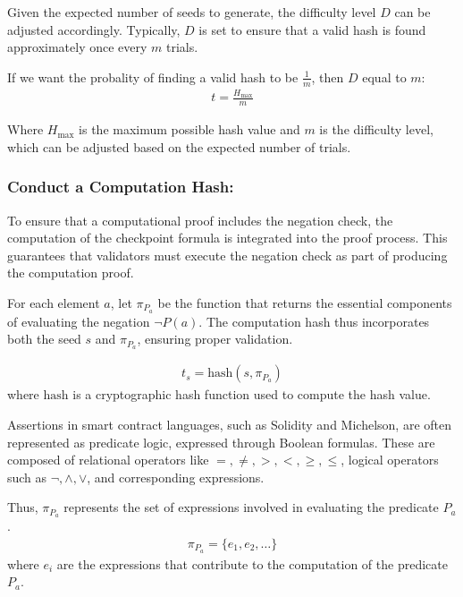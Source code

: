 \documentclass[runningheads]{llncs}
\begin{document}
Given the expected number of seeds to generate, 
the difficulty level \( D \) can be adjusted accordingly. Typically, \( D \) is set to ensure that a valid hash is found approximately once every \( m \) trials.

If we want the probality of finding a valid hash to be $\frac{1}{m}$, then \( D \) equal to \( m \):
\begin{gather}
\label{eq:13}
t = \frac{H_{\text{max}}}{m}
\end{gather}

Where \( H_{\text{max}} \) is the maximum possible hash value and \( m \) is the difficulty level, which can be adjusted based on the expected number of trials.
\subsubsection{Conduct a Computation Hash:} To ensure that a computational proof includes the negation check, the computation of the checkpoint formula is integrated into the proof process. This guarantees that validators must execute the negation check as part of producing the computation proof.

For each element \( a \), let \(\pi_{P_{a}}\) be the function that returns the essential components of evaluating the negation \(\neg P(a)\). The computation hash thus incorporates both the seed \( s \) and \(\pi_{P_{a}}\), ensuring proper validation.

\begin{gather}
\label{eq:14}
t_s = \text{hash}(s, \pi_{P_{a}})
\end{gather}
where \(\text{hash}\) is a cryptographic hash function used to compute the hash value.

Assertions in smart contract languages, such as Solidity and Michelson, are often represented as predicate logic, expressed through Boolean formulas. These are composed of relational operators like \( =, \neq, >, <, \geq, \leq \), logical operators such as \( \neg, \land, \lor\), and corresponding expressions.

Thus, \(\pi_{P_{a}}\) represents the set of expressions involved in evaluating the predicate \(P_a\).
\begin{gather*}
\pi_{P_{a}} = \{ e_1, e_2, \ldots \}
\end{gather*}
where \(e_i\) are the expressions that contribute to the computation of the predicate \(P_a\).


\end{document}
